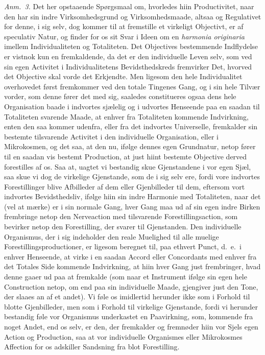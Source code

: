 \documentclass[12pt,a4paper]{book}
\newcommand{\apage}[1]{\marginnote{\footnotesize\textit{[#1]}}}
\begin{document}
{\small\emph{Anm.~3.} Det her opstaaende Spørgsmaal om, hvorledes hiin
Productivitet, naar den har sin indre Virksomhedsgrund og Virksomhedsmaade,
altsaa og Regulativet for denne, i sig selv, dog kommer til at fremstille et
virkeligt Objectivt, er af speculativ Natur, og finder for os sit Svar i Ideen
om en \textit{harmonia originaria} imellem Individualiteten og Totaliteten. Det
Objectives bestemmende Indflydelse er vistnok kun en fremkaldende, da det er den
individuelle Leven selv, som ved sin egen Activitet i Individualitetens
Bevidsthedskreds fremvirker Det, hvorved det Objective skal vorde det Erkjendte.
Men ligesom den hele Individualitet overhovedet først fremkommer ved den totale
Tingenes Gang, og i sin hele Tilvær vorder, som denne fører det med sig,
saaledes constitueres ogsaa dens hele Organisation baade i indvortes sjælelig og
i udvortes Henseende paa en saadan til Totaliteten svarende Maade, at enhver fra
Totaliteten kommende Indvirkning, enten den saa kommer udenfra, eller fra det
indvortes Universelle, fremkalder sin bestemte tilsvarende Activitet i den
individuelle Organisation, eller i Mikrokosmen, og det saa, at den nu, ifølge
dennes egen Grundnatur, netop fører til en saadan vis bestemt Production, at just
hiint bestemte Objective derved forestilles af os. Saa at, uagtet vi bestandig
skue Gjenstandene i vor egen Sjæl, saa skue vi dog de virkelige Gjenstande, som
de i sig selv ere, fordi vore indvortes Forestillinger blive Afbilleder af dem
eller Gjenbilleder til dem, eftersom vort indvortes Bevidsthedsliv, ifølge hiin
sin indre Harmonie med Totaliteten, naar det (vel at mærke) er i sin normale
Gang, hver Gang maa ud af sin egen indre Birken frembringe netop den Nerveaction
med tilsvarende Forestillingsaction, som bevirker netop den Forestilling, der
svarer til Gjenstanden. Den individuelle Organismus, der i sig indeholder den
reale Muelighed til alle muelige Forestillingsproductioner, er ligesom beregnet
til, paa ethvert Punct, d.\ e.\ i enhver Henseende, at virke i en saadan Accord
eller Concordants med enhver fra det Totales Side kommende Indvirkning, at hiin
hver Gang just frembringer, hvad denne gaaer ud paa at fremkalde (som naar et
Instrument ifølge sin egen hele Construction netop, om end paa sin individuelle
Maade, gjengiver just den Tone, der slaaes an af et andet). Vi føle os imidlertid
herunder ikke som i Forhold til blotte Gjenbilleder, men som i Forhold til
virkelige Gjenstande, fordi vi herunder bestandig føle vor Organismus underkastet
en Paavirkning, som, kommende fra noget Andet, end os selv, er den, der fremkalder
og fremnøder hiin vor Sjels egen Action og Production, saa at vor individuelle
Organismes eller Mikrokosmes Affection for os adskiller Sandsning fra blot
Forestilling.\par} \apage{12} 
\end{document}

